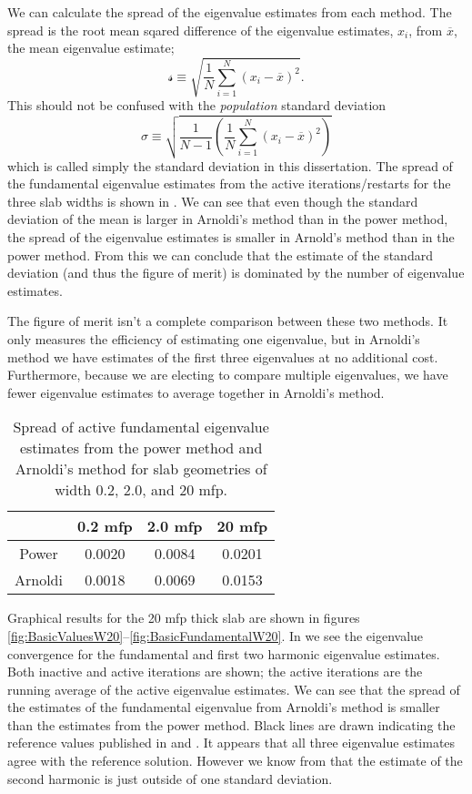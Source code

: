 We can calculate the spread of the eigenvalue estimates from each method.  The spread is the root mean sqared difference of the eigenvalue estimates, $x_i$, from $\overline{x}$, the mean eigenvalue estimate; \[\mathscr{s} \equiv \sqrt{\frac{1}{N}\sum_{i=1}^N \left(x_i - \overline{x}\right)^2}.\]  This should not be confused with the \emph{population} standard deviation \[\sigma \equiv \sqrt{\frac{1}{N-1}\left(\frac{1}{N}\sum_{i=1}^N \left(x_i - \overline{x}\right)^2\right)}\] which is called simply the standard deviation in this dissertation.  The spread of the fundamental eigenvalue estimates from the active iterations/restarts for the three slab widths is shown in .  We can see that even though the standard deviation of the mean is larger in Arnoldi's method than in the power method, the spread of the eigenvalue estimates is smaller in Arnold's method than in the power method.  From this we can conclude that the estimate of the standard deviation (and thus the figure of merit) is dominated by the number of eigenvalue estimates.  

The figure of merit isn't a complete comparison between these two methods.  It only measures the efficiency of estimating one eigenvalue, but in Arnoldi's method we have estimates of the first three eigenvalues at no additional cost.  Furthermore, because we are electing to compare multiple eigenvalues, we have fewer eigenvalue estimates to average together in Arnoldi's method.
\begin{table}[h]
    \centering
    \begin{tabular}{cccc}
        \toprule
        & 0.2 mfp & 2.0 mfp & 20 mfp \\
        \midrule
        Power    & 0.0020 & 0.0084 & 0.0201 \\
        Arnoldi  & 0.0018 & 0.0069 & 0.0153 \\
        \bottomrule
    \end{tabular}
    \caption{Spread of active fundamental eigenvalue estimates from the power method and Arnoldi's method for slab geometries of width 0.2, 2.0, and 20 mfp.}
    \label{tab:BasicSpread}
\end{table}

Graphical results for the 20 mfp thick slab are shown in figures \ref{fig:BasicValuesW20}--\ref{fig:BasicFundamentalW20}.  In  we see the eigenvalue convergence for the fundamental and first two harmonic eigenvalue estimates.  Both inactive and active iterations are shown; the active iterations are the running average of the active eigenvalue estimates.  We can see that the spread of the estimates of the fundamental eigenvalue from Arnoldi's method is smaller than the estimates from the power method.  Black lines are drawn indicating the reference values published in \cite{Garis:1991One-s-0} and \cite{Dahl:1979Eigen-0}.  It appears that all three eigenvalue estimates agree with the reference solution.  However we know from  that the estimate of the second harmonic is just outside of one standard deviation.

